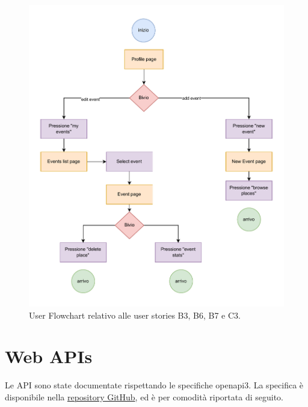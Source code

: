 \documentclass[9pt]{extarticle}
\begin{document}
\begin{figure}[!htb]
	\centering
	\includegraphics[width=0.8\linewidth]{./images/B3-B6-B7-C3.pdf}
	\caption{User Flowchart relativo alle user stories B3, B6, B7 e C3.}
	\label{fig:B3-B6-B7-C3}
\end{figure}

\newpage
\section{Web APIs}

Le API sono state documentate rispettando le specifiche openapi3. La specifica è disponibile nella \href{https://github.com/rtogni00/IS\_Progetto}{repository GitHub}, ed è per comodità riportata di seguito.
\end{document}
